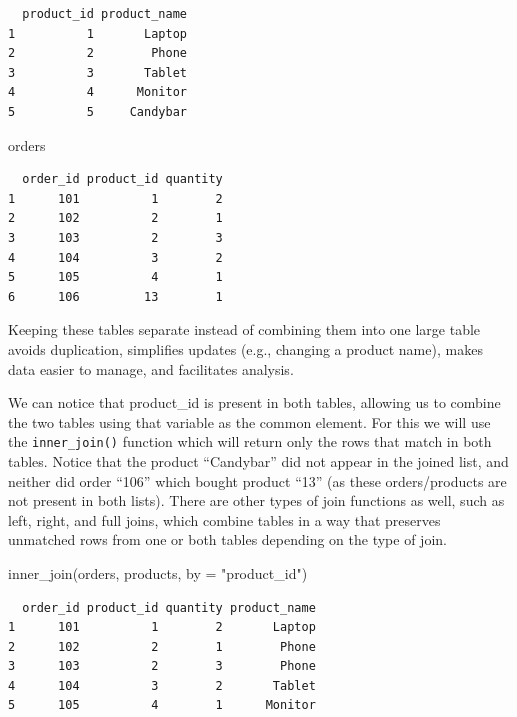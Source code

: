 \documentclass[
  letterpaper,
  DIV=11,
  numbers=noendperiod]{scrreprt}
\newenvironment{Shaded}{\begin{snugshade}}{\end{snugshade}}
\newcommand{\AttributeTok}[1]{\textcolor[rgb]{0.40,0.45,0.13}{#1}}
\newcommand{\FunctionTok}[1]{\textcolor[rgb]{0.28,0.35,0.67}{#1}}
\newcommand{\NormalTok}[1]{\textcolor[rgb]{0.00,0.23,0.31}{#1}}
\newcommand{\StringTok}[1]{\textcolor[rgb]{0.13,0.47,0.30}{#1}}
\begin{document}
\begin{verbatim}
  product_id product_name
1          1       Laptop
2          2        Phone
3          3       Tablet
4          4      Monitor
5          5     Candybar
\end{verbatim}

\begin{Shaded}
\begin{Highlighting}[]
\NormalTok{orders}
\end{Highlighting}
\end{Shaded}

\begin{verbatim}
  order_id product_id quantity
1      101          1        2
2      102          2        1
3      103          2        3
4      104          3        2
5      105          4        1
6      106         13        1
\end{verbatim}

Keeping these tables separate instead of combining them into one large
table avoids duplication, simplifies updates (e.g., changing a product
name), makes data easier to manage, and facilitates analysis.

We can notice that product\_id is present in both tables, allowing us to
combine the two tables using that variable as the common element. For
this we will use the \texttt{inner\_join()} function which will return
only the rows that match in both tables. Notice that the product
``Candybar'' did not appear in the joined list, and neither did order
``106'' which bought product ``13'' (as these orders/products are not
present in both lists). There are other types of join functions as well,
such as left, right, and full joins, which combine tables in a way that
preserves unmatched rows from one or both tables depending on the type
of join.

\begin{Shaded}
\begin{Highlighting}[]
\FunctionTok{inner\_join}\NormalTok{(orders, products, }\AttributeTok{by =} \StringTok{"product\_id"}\NormalTok{)}
\end{Highlighting}
\end{Shaded}

\begin{verbatim}
  order_id product_id quantity product_name
1      101          1        2       Laptop
2      102          2        1        Phone
3      103          2        3        Phone
4      104          3        2       Tablet
5      105          4        1      Monitor
\end{verbatim}
\end{document}
